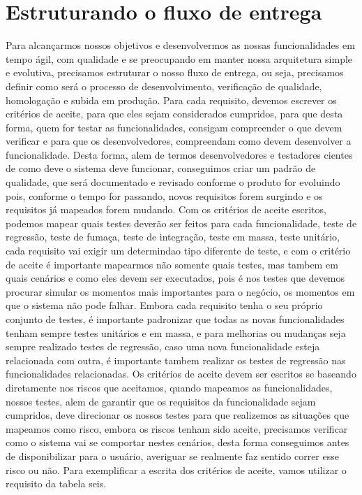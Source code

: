     \section{Estruturando o fluxo de entrega}
      Para alcançarmos nossos objetivos e desenvolvermos as nossas funcionalidades
      em tempo ágil, com qualidade e se preocupando em manter nossa arquitetura
      simple e evolutiva, precisamos estruturar o nosso fluxo de entrega, ou seja,
      precisamos definir como será o processo de desenvolvimento, verificação de
      qualidade, homologação e subida em produção. \newline
      Para cada requisito, devemos escrever os critérios de aceite, para que eles
      sejam considerados cumpridos, para que desta forma, quem for testar as
      funcionalidades, consigam compreender o que devem verificar e para que os
      desenvolvedores, compreendam como devem desenvolver a funcionalidade. Desta
      forma, alem de termos desenvolvedores e testadores cientes de como deve
      o sistema deve funcionar, conseguimos criar um padrão de qualidade, que será
      documentado e revisado conforme o produto for evoluindo pois, conforme o tempo
      for passando, novos requisitos forem surgindo e os requisitos já mapeados
      forem mudando. Com os critérios de aceite escritos, podemos mapear quais
      testes deverão ser feitos para cada funcionalidade, teste de regressão, teste
      de fumaça, teste de integração, teste em massa, teste unitário, cada requisito
      vai exigir um determindao tipo diferente de teste, e com o critério de aceite
      é importante mapearmos não somente quais testes, mas tambem em quais cenários
      e como eles devem ser executados, pois é nos testes que devemos procurar simular
      os momentos mais importantes para o negócio, os momentos em que o sistema não
      pode falhar. Embora cada requisito tenha o seu próprio conjunto de testes,
      é importante padronizar que todas as novas funcionalidades tenham sempre testes
      unitários e em massa, e para melhorias ou mudanças seja sempre realizado testes
      de regressão, caso uma nova funcionalidade esteja relacionada com outra, é
      importante tambem realizar os testes de regressão nas funcionalidades
      relacionadas. Os critérios de aceite devem ser escritos se baseando diretamente
      nos riscos que aceitamos, quando mapeamos as funcionalidades, nossos testes,
      alem de garantir que os requisitos da funcionalidade sejam cumpridos, deve
      direcionar os nossos testes para que realizemos as situações que mapeamos como
      risco, embora os riscos tenham sido aceite, precisamos verificar como o sistema
      vai se comportar nestes cenários, desta forma conseguimos antes de disponibilizar
      para o usuário, averiguar se realmente faz sentido correr esse risco ou não. \newline
      Para exemplificar a escrita dos critérios de aceite, vamos utilizar o requisito
      da tabela seis. \newline

